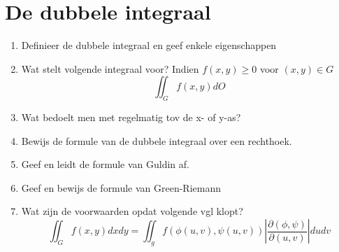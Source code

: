 \documentclass[12pt]{article}
\begin{document}
    \maketitle

    
    \section{De dubbele integraal}
    \begin{enumerate}
        \item Definieer de dubbele integraal en geef enkele eigenschappen
        \item Wat stelt volgende integraal voor? Indien $f(x,y) \geq 0$ voor $(x,y) \in G$
            $$ \iint_G f(x,y)dO $$
        \item Wat bedoelt men met regelmatig tov de x- of y-as?
        \item Bewijs de formule van de dubbele integraal over een rechthoek.
        \item Geef en leidt de formule van Guldin af.
        \item Geef en bewijs de formule van Green-Riemann
        \item Wat zijn de voorwaarden opdat volgende vgl klopt?
            $$ \iint_G f(x,y)dxdy = \iint_g f(\phi(u,v), \psi(u,v)) \left|\frac{\partial(\phi, \psi)}{\partial(u,v)}\right| dudv $$
    \end{enumerate}
\end{document}
